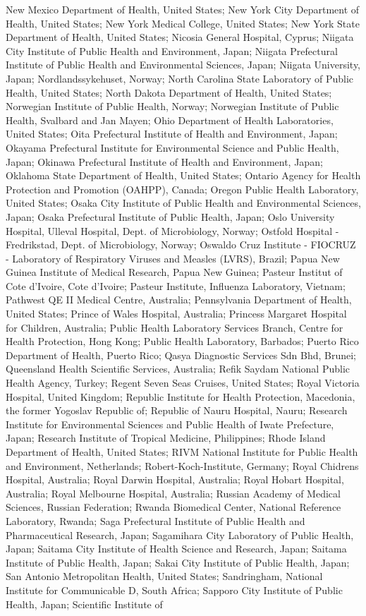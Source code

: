 New Mexico Department of Health, United States; New York City Department of Health, United States; New York Medical College, United States; New York State Department of Health, United States; Nicosia General Hospital, Cyprus; Niigata City Institute of Public Health and Environment, Japan; Niigata Prefectural Institute of Public Health and Environmental Sciences, Japan; Niigata University, Japan; Nordlandssykehuset, Norway; North Carolina State Laboratory of Public Health, United States; North Dakota Department of Health, United States; Norwegian Institute of Public Health, Norway; Norwegian Institute of Public Health, Svalbard and Jan Mayen; Ohio Department of Health Laboratories, United States; Oita Prefectural Institute of Health and Environment, Japan; Okayama Prefectural Institute for Environmental Science and Public Health, Japan; Okinawa Prefectural Institute of Health and Environment, Japan; Oklahoma State Department of Health, United States; Ontario Agency for Health Protection and Promotion (OAHPP), Canada; Oregon Public Health Laboratory, United States; Osaka City Institute of Public Health and Environmental Sciences, Japan; Osaka Prefectural Institute of Public Health, Japan; Oslo University Hospital, Ulleval Hospital, Dept. of Microbiology, Norway; Ostfold Hospital - Fredrikstad, Dept. of Microbiology, Norway; Oswaldo Cruz Institute - FIOCRUZ - Laboratory of Respiratory Viruses and Measles (LVRS), Brazil; Papua New Guinea Institute of Medical Research, Papua New Guinea; Pasteur Institut of Cote d'Ivoire, Cote d'Ivoire; Pasteur Institute, Influenza Laboratory, Vietnam; Pathwest QE II Medical Centre, Australia; Pennsylvania Department of Health, United States; Prince of Wales Hospital, Australia; Princess Margaret Hospital for Children, Australia; Public Health Laboratory Services Branch, Centre for Health Protection, Hong Kong; Public Health Laboratory, Barbados; Puerto Rico Department of Health, Puerto Rico; Qasya Diagnostic Services Sdn Bhd, Brunei; Queensland Health Scientific Services, Australia; Refik Saydam National Public Health Agency, Turkey; Regent Seven Seas Cruises, United States; Royal Victoria Hospital, United Kingdom; Republic Institute for Health Protection, Macedonia, the former Yogoslav Republic of; Republic of Nauru Hospital, Nauru; Research Institute for Environmental Sciences and Public Health of Iwate Prefecture, Japan; Research Institute of Tropical Medicine, Philippines; Rhode Island Department of Health, United States; RIVM National Institute for Public Health and Environment, Netherlands; Robert-Koch-Institute, Germany; Royal Chidrens Hospital, Australia; Royal Darwin Hospital, Australia; Royal Hobart Hospital, Australia; Royal Melbourne Hospital, Australia; Russian Academy of Medical Sciences, Russian Federation; Rwanda Biomedical Center, National Reference Laboratory, Rwanda; Saga Prefectural Institute of Public Health and Pharmaceutical Research, Japan; Sagamihara City Laboratory of Public Health, Japan; Saitama City Institute of Health Science and Research, Japan; Saitama Institute of Public Health, Japan; Sakai City Institute of Public Health, Japan; San Antonio Metropolitan Health, United States; Sandringham, National Institute for Communicable D, South Africa; Sapporo City Institute of Public Health, Japan; Scientific Institute of 